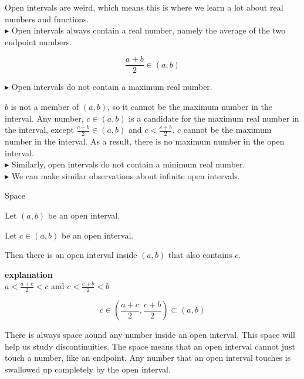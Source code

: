 \documentclass{ximera}
\begin{document}
Open intervals are weird, which means this is where we learn a lot about real numbers and functions. \\


$\blacktriangleright$  Open intervals always contain a real number, namely the average of the two endpoint numbers.



\[  \frac{a+b}{2}  \in (a,b)    \]





$\blacktriangleright$ Open intervals do not contain a maximum real number.

$b$ is not a member of $(a,b)$, so it cannot be the maximum number in the interval.   Any number, $c \in (a,b)$ is a candidate for the maximum real number in the interval, except  $\frac{c+b}{2} \in (a,b)$  and $c < \frac{c+b}{2}$.  $c$ cannot be the maximum number in the interval.  As a result, there is no maximum number in the open interval. \\


$\blacktriangleright$ Similarly, open intervals do not contain a minimum real number. \\


$\blacktriangleright$ We can make similar observations about infinite open intervals. \\




\begin{observation} Space


Let $(a,b)$ be an open interval.

Let $c \in (a,b)$ be an open interval.

Then there is an open interval inside $(a,b)$ that also contains $c$.

\textbf{\textcolor{purple!50!blue!90!black}{explanation}} \\







$a < \frac{a+c}{2} < c$ and  $c < \frac{c+b}{2}  < b$



\[   c \in \left(\frac{a+c}{2} , \frac{c+b}{2} \right) \subset (a,b)              \]


\end{observation}


There is always space aound any number inside an open interval.  This space will help us study discontinuities.  The space means that an open interval cannot just touch a number, like an endpoint.  Any number that an open interval touches is swallowed up completely by the open interval.
\end{document}
